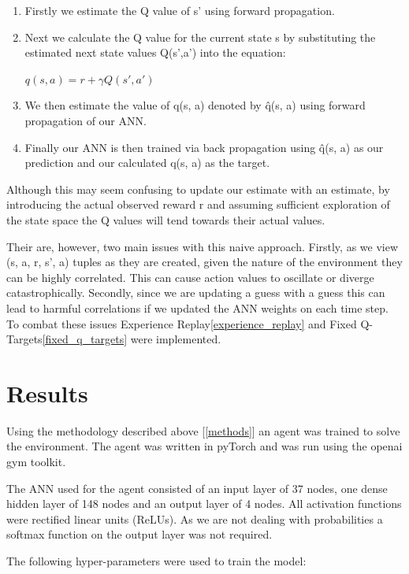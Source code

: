 \documentclass[12pt]{article}
\begin{document}
\begin{enumerate}
	\item Firstly we estimate the Q value of s' using forward propagation.
	\item Next we calculate the Q value for the current state s by substituting the estimated next state values Q(s',a') 
			into the equation:
	\begin{center}
		$q(s,a) = r+\gamma Q(s',a') $
	\end{center}
	\item We then estimate the value of q(s, a) denoted by \^q(s, a) using forward propagation of our ANN.
	\item Finally our ANN is then trained via back propagation using  \^q(s, a) as our prediction and our calculated q(s, a) as the target.
\end{enumerate}

Although this may seem confusing to update our estimate with an estimate, by introducing the actual observed reward r 
and assuming sufficient exploration of the state space the Q values will tend towards their actual values.

Their are, however, two main issues with this naive approach. 
Firstly, as we view (s, a, r, s', a) tuples as they are created, 
given the nature of the environment they can be highly correlated.
This can cause action values to oscillate or diverge catastrophically.
Secondly, since we are updating a guess with a guess this can lead to harmful correlations if we updated the ANN weights on each time step.
To combat these issues Experience Replay\ref{experience_replay} and Fixed Q-Targets\ref{fixed_q_targets} were implemented.

\section{Results}

Using the methodology described above [\ref{methods}] an agent was trained to solve the environment.
The agent was written in pyTorch and was run using the openai gym toolkit.

The ANN used for the agent consisted of an input layer of 37 nodes, one dense hidden layer of 148 nodes and an output layer of 4 nodes.
All activation functions were rectified linear units (ReLUs). 
As we are not dealing with probabilities a softmax function on the output layer was not required.

The following hyper-parameters were used to train the model:
\end{document}
